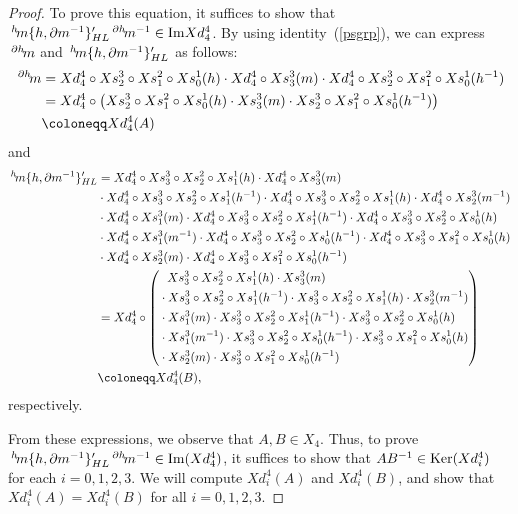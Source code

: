 \documentclass{tac}
\newcommand{\act}[1]{\,\sp{#1}\!}
\begin{document}
\begin{proof}
To prove this equation, it suffices to show that $\act{h}m\{h,\partial m^{-1}\}'_{HL}\act{\partial h}m^{-1} \in {\rm Im}Xd^4_4 $. By using identity (\ref{psgrp}), we can express $\act{\partial h}m$ and $ \act{h}m\{h,\partial m^{-1}\}'_{HL}$ as follows:
\begin{align*}
\act{\partial h}m &=
Xd^4_4\circ Xs^3_2\circ Xs^2_1\circ Xs^1_0(h)\cdot Xd^4_4\circ Xs^3_3(m)\cdot Xd^4_4\circ Xs^3_2\circ Xs^2_1\circ Xs^1_0(h^{-1})\\
&=Xd^4_4\circ \left(Xs^3_2\circ Xs^2_1\circ Xs^1_0(h)\cdot  Xs^3_3(m)\cdot  Xs^3_2\circ Xs^2_1\circ Xs^1_0(h^{-1})\right)\\
&\coloneqq Xd^4_4 (A)
\end{align*}
 and
\begin{align*}
\act{h}m\{h,\partial m^{-1}\}'_{HL} &= 
Xd^4_4\circ Xs^3_3\circ Xs^2_2\circ Xs^1_1(h)\cdot Xd^4_4\circ Xs^3_3(m)\\
&\cdot Xd^4_4\circ Xs^3_3\circ Xs^2_2\circ Xs^1_1(h^{-1})\cdot Xd^4_4\circ Xs^3_3\circ Xs^2_2\circ Xs^1_1(h)\cdot Xd^4_4\circ Xs^3_2(m^{-1})\\
&\cdot Xd^4_4\circ Xs^3_1(m)\cdot Xd^4_4\circ Xs^3_3\circ Xs^2_2\circ Xs^1_1(h^{-1})\cdot Xd^4_4\circ Xs^3_3\circ Xs^2_2\circ Xs^1_0(h)\\
&\cdot Xd^4_4\circ Xs^3_1(m^{-1})\cdot Xd^4_4\circ Xs^3_3\circ Xs^2_2\circ Xs^1_0(h^{-1})\cdot Xd^4_4\circ Xs^3_3\circ Xs^2_1\circ Xs^1_0(h)\\
&\cdot Xd^4_4\circ Xs^3_2(m)\cdot Xd^4_4\circ Xs^3_3\circ Xs^2_1\circ Xs^1_0(h^{-1})\\
&=Xd^4_4\circ
\left(
    \begin{aligned}
&\ \ Xs^3_3\circ Xs^2_2\circ Xs^1_1(h)\cdot Xs^3_3(m)\\
&\cdot  Xs^3_3\circ Xs^2_2\circ Xs^1_1(h^{-1})\cdot  Xs^3_3\circ Xs^2_2\circ Xs^1_1(h)\cdot  Xs^3_2(m^{-1})\\
&\cdot  Xs^3_1(m)\cdot  Xs^3_3\circ Xs^2_2\circ Xs^1_1(h^{-1})\cdot  Xs^3_3\circ Xs^2_2\circ Xs^1_0(h)\\
&\cdot  Xs^3_1(m^{-1})\cdot  Xs^3_3\circ Xs^2_2\circ Xs^1_0(h^{-1})\cdot  Xs^3_3\circ Xs^2_1\circ Xs^1_0(h)\\
&\cdot  Xs^3_2(m)\cdot  Xs^3_3\circ Xs^2_1\circ Xs^1_0(h^{-1})
    \end{aligned}
\right)\\
&\coloneqq Xd^4_4(B),
\end{align*}
 respectively.

From these expressions, we observe that $A, B \in X_4$. Thus, to prove $\act{h}m\{h,\partial m^{-1}\}'_{HL}\act{\partial h}m^{-1} \in {\rm Im}(Xd^4_4)$, it suffices to show that $AB^{-1} \in {\rm Ker}(Xd^4_i)$ for each $i=0,1,2,3$. We will compute $Xd^4_i(A)$ and $Xd^4_i(B)$, and show that $Xd^4_i(A)=Xd^4_i(B)$ for all $i=0,1,2,3$.


\end{proof}
\end{document}

